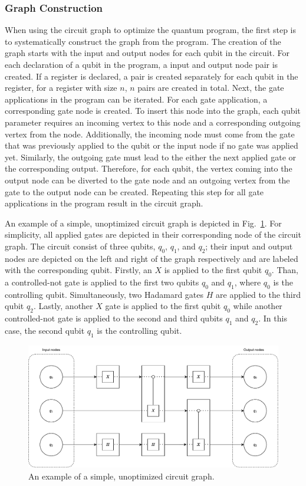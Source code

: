 \subsubsection{Graph Construction}
When using the circuit graph to optimize the quantum program, the first step is to systematically construct the graph from the program. The creation of the graph starts with the input and output nodes for each qubit in the circuit. For each declaration of a qubit in the program, a input and output node pair is created. If a register is declared, a pair is created separately for each qubit in the register, \ie for a register with size $n$, $n$ pairs are created in total. Next, the gate applications in the program can be iterated. For each gate application, a corresponding gate node is created. To insert this node into the graph, each qubit parameter requires an incoming vertex to this node and a corresponding outgoing vertex from the node. Additionally, the incoming node must come from the gate that was previously applied to the qubit or the input node if no gate was applied yet. Similarly, the outgoing gate must lead to the either the next applied gate or the corresponding output. Therefore, for each qubit, the vertex coming into the output node can be diverted to the gate node and an outgoing vertex from the gate to the output node can be created. Repeating this step for all gate applications in the program result in the circuit graph.  

An example of a simple, unoptimized circuit graph is depicted in Fig.~\ref{fig:circuit_graph_unoptimized}. For simplicity, all applied gates are depicted in their corresponding node of the circuit graph. The circuit consist of three qubits, $q_0$, $q_1$, and $q_2$; their input and output nodes are depicted on the left and right of the graph respectively and are labeled with the corresponding qubit. Firstly, an $X$ is applied to the first qubit $q_0$. Than, a controlled-not gate is applied to the first two qubits $q_0$ and $q_1$, where $q_0$ is the controlling qubit. Simultaneously, two Hadamard gates $H$ are applied to the third qubit $q_2$. Lastly, another $X$ gate is applied to the first qubit $q_0$ while another controlled-not gate is applied to the second and third qubits $q_1$ and $q_2$. In this case, the second qubit $q_1$ is the controlling qubit.

\begin{figure}[htp]
    \centering     
    \includegraphics[width=.9\textwidth]{../figures/circuit_graph_unoptimized.pdf}
    \caption{An example of a simple, unoptimized circuit graph.}
    \label{fig:circuit_graph_unoptimized}
\end{figure}

